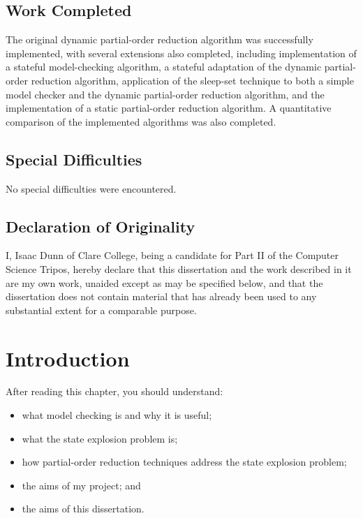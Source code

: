 \documentclass[12pt,a4paper,twoside,openright]{report}
\newenvironment{understandinglist}
	{\begin{itemize} \itemsep 0em}{\end{itemize}}
\begin{document}
\section*{Work Completed}

The original dynamic partial-order reduction algorithm
was successfully implemented, with several extensions
also completed, including implementation of a stateful
model-checking algorithm, a stateful adaptation of the
dynamic partial-order reduction algorithm, application
of the sleep-set technique to both a simple model checker
and the dynamic partial-order reduction algorithm,
and the implementation of a static partial-order reduction
algorithm. A quantitative comparison of the implemented
algorithms was also completed.

\section*{Special Difficulties}

No special difficulties were encountered.
 
\section*{Declaration of Originality}

I, Isaac Dunn of Clare College, being a candidate for Part II of the Computer
Science Tripos, hereby declare
that this dissertation and the work described in it are my own work,
unaided except as may be specified below, and that the dissertation
does not contain material that has already been used to any substantial
extent for a comparable purpose.

\bigskip
{}

\bigskip
{}

\setcounter{tocdepth}{1} %
\tableofcontents

%


\pagestyle{headings}

\chapter{Introduction}
After reading this chapter,
you should understand:
\begin{understandinglist}
	\item what model checking is and why it is useful;
	\item what the state explosion problem is;
	\item how partial-order reduction
	techniques address the state explosion problem;
	\item the aims of my project; and
	\item the aims of this dissertation.
\end{understandinglist}
\end{document}
